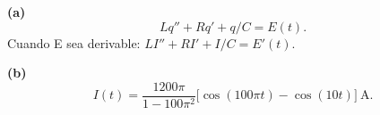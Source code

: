 \noindent\textbf{(a)} \[Lq''+Rq'+q/C=E(t).\]
Cuando E sea derivable: \(LI''+RI'+I/C=E'(t)\).

\noindent\textbf{(b)} \[I(t)=\frac{1200\pi}{1-100\pi^2}\big[\cos(100\pi t)-\cos(10t)\big]\ \mathrm A.\]
